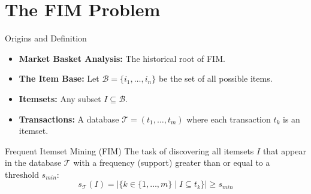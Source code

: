 
\section{The FIM Problem}

\begin{frame}{Origins and Definition}
    \begin{itemize}
        \item \textbf{Market Basket Analysis:} The historical root of FIM. 
        \item \textbf{The Item Base:} Let $\mathcal{B} = \{i_1, \dots, i_n\}$ be the set of all possible items.
        \item \textbf{Itemsets:} Any subset $I \subseteq \mathcal{B}$.
        \item \textbf{Transactions:} A database $\mathcal{T} = (t_1, \dots, t_m)$ where each transaction $t_k$ is an itemset.
    \end{itemize}

    \vfill

    \begin{alertblock}{Frequent Itemset Mining (FIM)}
        The task of discovering all itemsets $I$ that appear in the database $\mathcal{T}$ with a frequency (support) greater than or equal to a threshold $s_{min}$:
        \[ s_{\mathcal{T}}(I) = |\{k \in \{1, \dots, m\} \mid I \subseteq t_k\}| \geq s_{min} \]
    \end{alertblock}
\end{frame}

